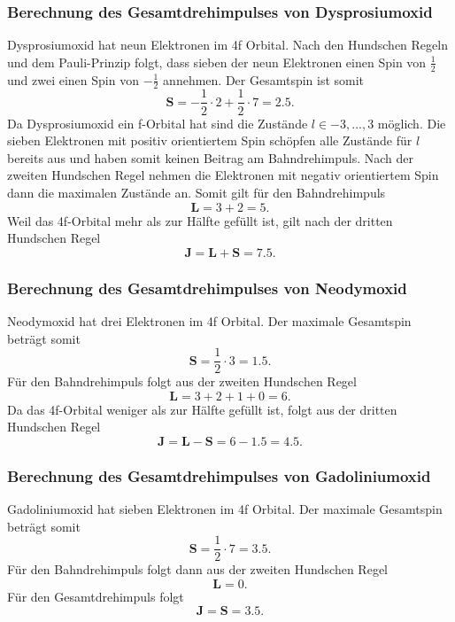 \subsubsection{Berechnung des Gesamtdrehimpulses von Dysprosiumoxid}
Dysprosiumoxid hat neun Elektronen im 4f Orbital. Nach den Hundschen Regeln und dem Pauli-Prinzip folgt, dass sieben der neun Elektronen einen Spin von $\frac{1}{2}$ und zwei 
einen Spin von $-\frac{1}{2}$ annehmen. Der Gesamtspin ist somit
\begin{equation*}
  \textbf{S} = -\frac{1}{2} \cdot 2 + \frac{1}{2} \cdot 7 = 2.5.
\end{equation*}
Da Dysprosiumoxid ein f-Orbital hat sind die Zustände $l \in {-3, ..., 3}$ möglich. Die sieben Elektronen mit positiv orientiertem Spin schöpfen alle Zustände für $l$ bereits aus
und haben somit keinen Beitrag am Bahndrehimpuls. Nach der zweiten Hundschen Regel nehmen die Elektronen mit negativ orientiertem Spin dann die maximalen Zustände an.
Somit gilt für den Bahndrehimpuls
\begin{equation*}
  \textbf{L} = 3 + 2 = 5.
\end{equation*}
Weil das 4f-Orbital mehr als zur Hälfte gefüllt ist, gilt nach der dritten Hundschen Regel
\begin{equation*}
  \textbf{J} = \textbf{L} + \textbf{S} = 7.5.
\end{equation*}
\subsubsection{Berechnung des Gesamtdrehimpulses von Neodymoxid}
Neodymoxid hat drei Elektronen im 4f Orbital. Der maximale Gesamtspin beträgt somit
\begin{equation*}
  \textbf{S} = \frac{1}{2} \cdot 3 = 1.5.
\end{equation*}
Für den Bahndrehimpuls folgt aus der zweiten Hundschen Regel
\begin{equation*}
  \textbf{L} = 3 + 2 + 1 + 0 = 6.
\end{equation*}
Da das 4f-Orbital weniger als zur Hälfte gefüllt ist, folgt aus der dritten Hundschen Regel
\begin{equation*}
  \textbf{J} = \textbf{L} - \textbf{S} = 6 - 1.5 = 4.5.
\end{equation*}
\subsubsection{Berechnung des Gesamtdrehimpulses von Gadoliniumoxid}
Gadoliniumoxid hat sieben Elektronen im 4f Orbital. Der maximale Gesamtspin beträgt somit
\begin{equation*}
  \textbf{S} = \frac{1}{2} \cdot 7 = 3.5.
\end{equation*}
Für den Bahndrehimpuls folgt dann aus der zweiten Hundschen Regel
\begin{equation*}
  \textbf{L} = 0.
\end{equation*}
Für den Gesamtdrehimpuls folgt
\begin{equation*}
  \textbf{J} = \textbf{S} = 3.5.
\end{equation*}
